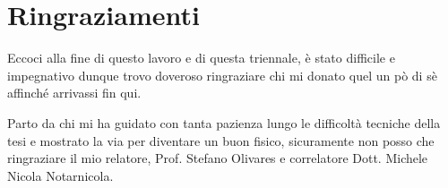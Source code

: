 \chapter*{Ringraziamenti}

{\small
\begin{flushright}
    Eccoci alla fine di questo lavoro e di questa triennale, è stato difficile e impegnativo dunque trovo doveroso ringraziare chi mi donato quel un pò di sè affinché arrivassi fin qui.
    \newline
    \phantom{\,}
    \newline
    \par
    Parto da chi mi ha guidato con tanta pazienza lungo le difficoltà tecniche della tesi e mostrato la via per diventare un buon fisico, sicuramente non posso che ringraziare il mio relatore, Prof. Stefano Olivares e correlatore Dott. Michele Nicola Notarnicola.
    \newline
    \phantom{\,}
    \newline
    \par
\end{flushright}
}